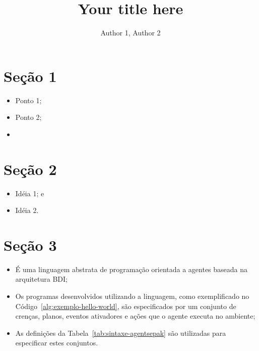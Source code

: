 \documentclass[a0,portrait]{lab-poster}
\title{Your title here}
\author{Author 1, Author 2}
\begin{document}
\maketitle


\begin{multicols}{2} 
\section*{Seção 1}
\Large
\justifying

\begin{itemize}
	\item Ponto 1;
	\item Ponto 2;
	\item 
\end{itemize}

\section*{\huge Seção 2}

\begin{itemize}
	\item Idéia 1; e
	\item Idéia 2.
\end{itemize}

\section*{\huge Seção 3}

\begin{itemize}
	\item É uma linguagem abstrata de programação orientada a agentes baseada na arquitetura BDI;
	\item Os programas desenvolvidos utilizando a linguagem, como exemplificado no Código~\ref{alg:exemplo-hello-world}, são especificados por um conjunto de crenças, planos, eventos ativadores e ações que o agente executa no ambiente;
	\item As definições da Tabela~\ref{tab:sintaxe-agentsepak} são utilizadas para especificar estes conjuntos.
\end{itemize}


\end{multicols}
\end{document}
